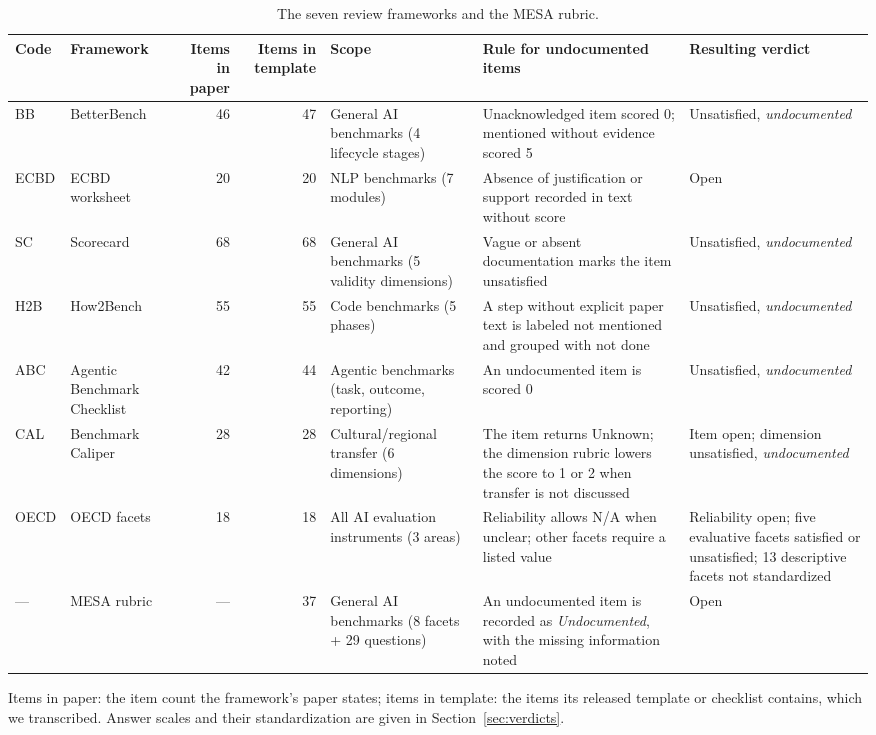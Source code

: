\documentclass[10pt,conference]{IEEEtran}
\begin{document}
\begin{table}[t]
\caption{The seven review frameworks and the MESA rubric.}
\label{tab:frameworks}
\centering
\footnotesize
\begin{tabularx}{\textwidth}{@{}l>{\raggedright\arraybackslash}p{2.6cm}rr>{\raggedright\arraybackslash}p{3.1cm}>{\raggedright\arraybackslash}XX@{}}
\toprule
\textbf{Code} & \textbf{Framework} & \textbf{Items in paper} & \textbf{Items in template} & \textbf{Scope} & \textbf{Rule for undocumented items} & \textbf{Resulting verdict} \\
\midrule
BB & BetterBench \cite{reuel_betterbench} & 46 & 47 & General AI benchmarks (4 lifecycle stages) & Unacknowledged item scored 0; mentioned without evidence scored 5 & Unsatisfied, \emph{undocumented} \\
ECBD & ECBD worksheet \cite{liu_ecbd_2024} & 20 & 20 & NLP benchmarks (7 modules) & Absence of justification or support recorded in text without score & Open \\
SC & Scorecard \cite{san_joaquin_scorecard_2026} & 68 & 68 & General AI benchmarks (5 validity dimensions) & Vague or absent documentation marks the item unsatisfied & Unsatisfied, \emph{undocumented} \\
H2B & How2Bench \cite{cao_how2bench_2025} & 55 & 55 & Code benchmarks (5 phases) & A step without explicit paper text is labeled not mentioned and grouped with not done & Unsatisfied, \emph{undocumented} \\
ABC & Agentic Benchmark Checklist \cite{zhu_agentic_benchmark_checklist_2025} & 42 & 44 & Agentic benchmarks (task, outcome, reporting) & An undocumented item is scored 0 & Unsatisfied, \emph{undocumented} \\
CAL & Benchmark Caliper \cite{corona_benchmark_caliper_2026} & 28 & 28 & Cultural/regional transfer (6 dimensions) & The item returns Unknown; the dimension rubric lowers the score to 1 or 2 when transfer is not discussed & Item open; dimension unsatisfied, \emph{undocumented} \\
OECD & OECD facets \cite{cohn_hernandez_orallo_oecd_2023} & 18 & 18 & All AI evaluation instruments (3 areas) & Reliability allows N/A when unclear; other facets require a listed value & Reliability open; five evaluative facets satisfied or unsatisfied; 13 descriptive facets not standardized \\
\midrule
--- & MESA rubric & --- & 37 & General AI benchmarks (8 facets + 29 questions) & An undocumented item is recorded as \emph{Undocumented}, with the missing information noted & Open \\
\bottomrule
\end{tabularx}
\par\vspace{2pt}\raggedright\footnotesize Items in paper: the item count the framework's paper states; items in template: the items its released template or checklist contains, which we transcribed. Answer scales and their standardization are given in Section~\ref{sec:verdicts}.
\end{table}
\end{document}
